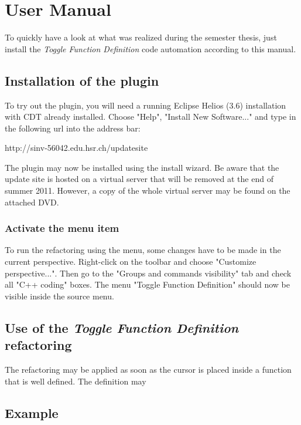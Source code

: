 \chapter{User Manual}
\thispagestyle{fancy}

To quickly have a look at what was realized during the semester thesis, just 
install the \textit{Toggle Function Definition} code automation according to 
this manual.

\section{Installation of the plugin}

To try out the plugin, you will need a running Eclipse Helios (3.6) installation with CDT already installed. Choose "Help", "Install New Software..." and type in the following url into the address bar:

http://sinv-56042.edu.hsr.ch/updatesite

The plugin may now be installed using the install wizard. Be aware that the 
update site is hosted on a virtual server that will be removed at the end of 
summer 2011. However, a copy of the whole virtual server may be found on the 
attached DVD.

\subsection{Activate the menu item}

To run the refactoring using the menu, some changes have to be made in the current perspective. Right-click on the toolbar and choose "Customize perspective...". Then go to the "Groups and commands visibility" tab and check all "C++ coding" boxes. The menu "Toggle Function Definition" should now be visible inside the source menu.

\section{Use of the \textit{Toggle Function Definition} refactoring}

The refactoring may be applied as soon as the cursor is placed inside a function that is well defined. The definition may 

\section{Example}

